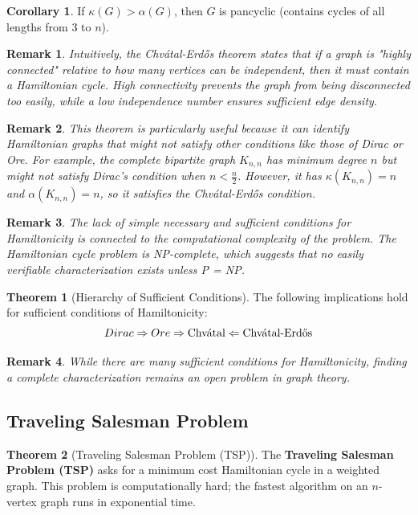 \documentclass{article}
\newtheorem{remark}{Remark}
\theoremstyle{definition}
\newtheorem{theorem}{Theorem}
\newtheorem{corollary}{Corollary}
\begin{document}
\begin{corollary}
If $\kappa(G) > \alpha(G)$, then $G$ is pancyclic (contains cycles of all lengths from 3 to $n$).
\end{corollary}

\begin{remark}
Intuitively, the Chvátal-Erdős theorem states that if a graph is "highly connected" relative to how many vertices can be independent, then it must contain a Hamiltonian cycle. High connectivity prevents the graph from being disconnected too easily, while a low independence number ensures sufficient edge density.
\end{remark}

\begin{remark}
This theorem is particularly useful because it can identify Hamiltonian graphs that might not satisfy other conditions like those of Dirac or Ore. For example, the complete bipartite graph $K_{n,n}$ has minimum degree $n$ but might not satisfy Dirac's condition when $n < \frac{n}{2}$. However, it has $\kappa(K_{n,n}) = n$ and $\alpha(K_{n,n}) = n$, so it satisfies the Chvátal-Erdős condition.
\end{remark}

\begin{remark}
The lack of simple necessary and sufficient conditions for Hamiltonicity is connected to the computational complexity of the problem. The Hamiltonian cycle problem is NP-complete, which suggests that no easily verifiable characterization exists unless P = NP.
\end{remark}

\begin{theorem}[Hierarchy of Sufficient Conditions]
The following implications hold for sufficient conditions of Hamiltonicity:
\[Dirac \Rightarrow Ore \Rightarrow \text{Chv\'{a}tal} \Leftarrow \text{Chv\'{a}tal-Erd\H{o}s}\]
\end{theorem}

\begin{remark}
While there are many sufficient conditions for Hamiltonicity, finding a complete characterization remains an open problem in graph theory.
\end{remark}

\subsection{Traveling Salesman Problem}

\begin{theorem}[Traveling Salesman Problem (TSP)]
The \textbf{Traveling Salesman Problem (TSP)} asks for a minimum cost Hamiltonian cycle in a
weighted graph. This problem is computationally hard; the fastest algorithm on an $n$-vertex graph runs in
exponential time.
\end{theorem}
\end{document}
